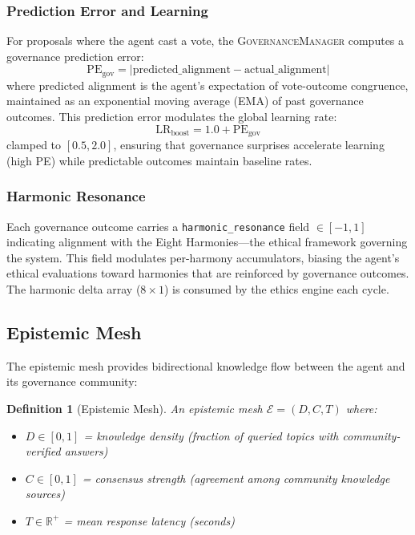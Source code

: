 \documentclass[11pt,a4paper]{article}
\newtheorem{definition}{Definition}
\begin{document}
\subsubsection{Prediction Error and Learning}

For proposals where the agent cast a vote, the \textsc{GovernanceManager} computes a governance prediction error:
\[
\text{PE}_{\text{gov}} = |\text{predicted\_alignment} - \text{actual\_alignment}|
\]
where predicted alignment is the agent's expectation of vote-outcome congruence, maintained as an exponential moving average (EMA) of past governance outcomes.
This prediction error modulates the global learning rate:
\[
\text{LR}_{\text{boost}} = 1.0 + \text{PE}_{\text{gov}}
\]
clamped to $[0.5, 2.0]$, ensuring that governance surprises accelerate learning (high PE) while predictable outcomes maintain baseline rates.

\subsubsection{Harmonic Resonance}

Each governance outcome carries a \texttt{harmonic\_resonance} field $\in [-1, 1]$ indicating alignment with the Eight Harmonies---the ethical framework governing the system.
This field modulates per-harmony accumulators, biasing the agent's ethical evaluations toward harmonies that are reinforced by governance outcomes.
The harmonic delta array ($8 \times 1$) is consumed by the ethics engine each cycle.

\subsection{Epistemic Mesh}

The epistemic mesh provides bidirectional knowledge flow between the agent and its governance community:

\begin{definition}[Epistemic Mesh]
An epistemic mesh $\mathcal{E} = (D, C, T)$ where:
\begin{itemize}
  \item $D \in [0, 1]$ = knowledge density (fraction of queried topics with community-verified answers)
  \item $C \in [0, 1]$ = consensus strength (agreement among community knowledge sources)
  \item $T \in \mathbb{R}^+$ = mean response latency (seconds)
\end{itemize}
\end{definition}
\end{document}
